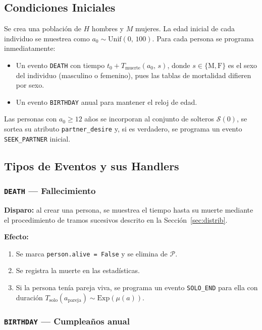 \documentclass[12pt, a4paper]{article}
\newcommand{\Exp}[1]{\mathrm{Exp}\!\left(#1\right)}
\newcommand{\Unif}[2]{\mathrm{Unif}\!\left(#1,\,#2\right)}
\newcommand{\code}[1]{\texttt{#1}}
\begin{document}
\subsection{Condiciones Iniciales}

Se crea una población de $H$ hombres y $M$ mujeres.
La edad inicial de cada individuo se muestrea como
$a_0 \sim \Unif{0}{100}$.
Para cada persona se programa inmediatamente:
\begin{itemize}
  \item Un evento \code{DEATH} con tiempo $t_0 + T_\mathrm{muerte}(a_0,\, s)$,
        donde $s \in \{\text{M},\text{F}\}$ es el sexo del individuo
        (masculino o femenino), pues las tablas de mortalidad difieren por sexo.
  \item Un evento \code{BIRTHDAY} anual para mantener el reloj de edad.
\end{itemize}
Las personas con $a_0 \geq 12$ años se incorporan al conjunto de solteros
$\mathcal{S}(0)$, se sortea su atributo \code{partner\_desire} y, si es
verdadero, se programa un evento \code{SEEK\_PARTNER} inicial.

\subsection{Tipos de Eventos y sus Handlers}

\subsubsection*{\code{DEATH} — Fallecimiento}

\textbf{Disparo:} al crear una persona, se muestrea el tiempo hasta su muerte
mediante el procedimiento de tramos sucesivos descrito en la
Sección~\ref{sec:distrib}.

\textbf{Efecto:}
\begin{enumerate}
  \item Se marca \code{person.alive = False} y se elimina de $\mathcal{P}$.
  \item Se registra la muerte en las estadísticas.
  \item Si la persona tenía pareja viva, se programa un evento
        \code{SOLO\_END} para ella con duración
        $T_\mathrm{solo}(a_\mathrm{pareja}) \sim \Exp{\mu(a)}$.
\end{enumerate}

\subsubsection*{\code{BIRTHDAY} — Cumpleaños anual}
\end{document}
